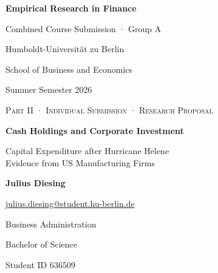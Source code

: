 \begin{titlepage}
  \thispagestyle{empty}
  \singlespacing
  \centering

  \vspace*{0.5cm}

  {\fontsize{28}{30}\bfseries\selectfont
  Empirical Research in Finance\par
  }

  \vspace*{0.5cm}

  {\fontsize{18}{14}\selectfont
  Combined Course Submission · Group A\par
  }

  \vspace*{0.75cm}

  {\fontsize{10}{12}\selectfont
  Humboldt-Universität zu Berlin\par
  \vspace*{0.15cm}
  School of Business and Economics\par
  \vspace*{0.15cm}
  Summer Semester 2026\par
  }

  \vspace*{2cm}

  {\fontsize{12}{10}\scshape\selectfont
  Part II · Individual Submission · Research Proposal\par
  }

  \vspace*{0.35cm}

  {\fontsize{20}{16}\bfseries\selectfont
  Cash Holdings and Corporate Investment\par
  }

  \vspace*{0.35cm}

  {\fontsize{13}{16}\selectfont
    Capital Expenditure after Hurricane Helene\\
    Evidence from US Manufacturing Firms\par
  }

  \vspace*{2cm}

  \noindent

  \begin{minipage}[t]{0.45\textwidth}
    \centering
    {\large \bfseries Julius Diesing\par}
    \vspace*{0.12cm}
    {\href{mailto:julius.diesing@student.hu-berlin.de}{julius.diesing@student.hu-berlin.de}\par}
    {Business Administration\par}
    {Bachelor of Science\par}
    {Student ID 636509\par}
  \end{minipage}
  \par


\end{titlepage}

